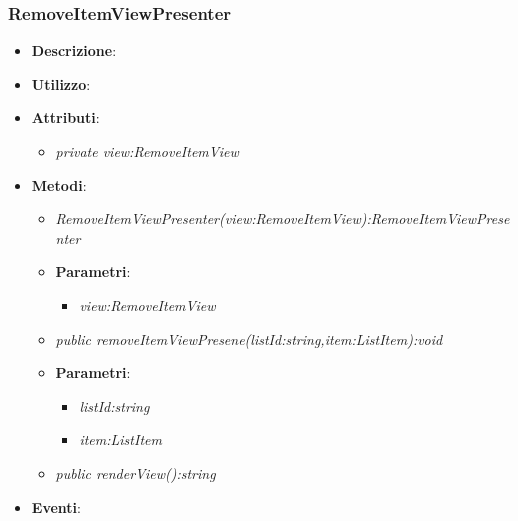\subsubsection{RemoveItemViewPresenter}
\begin{itemize}
\item \textbf{Descrizione}: 
\item \textbf{Utilizzo}:
\item \textbf{Attributi}: 
	\begin{itemize}
	\item \textit{private view:RemoveItemView}\\

	\end{itemize}
\item \textbf{Metodi}:
	\begin{itemize}
	\item \textit{RemoveItemViewPresenter(view:RemoveItemView):RemoveItemViewPresenter}\\

			\item{\textbf{Parametri}: \begin{itemize}
			\item \textit{view:RemoveItemView}\\
			
			\end{itemize}}
	\item \textit{public removeItemViewPresene(listId:string,item:ListItem):void}\\

			\item{\textbf{Parametri}: \begin{itemize}
			\item \textit{listId:string}\\

			\item \textit{item:ListItem}\\

			\end{itemize}}
	\item \textit{public renderView():string}\\

	\end{itemize}
\item \textbf{Eventi}:
\end{itemize}

